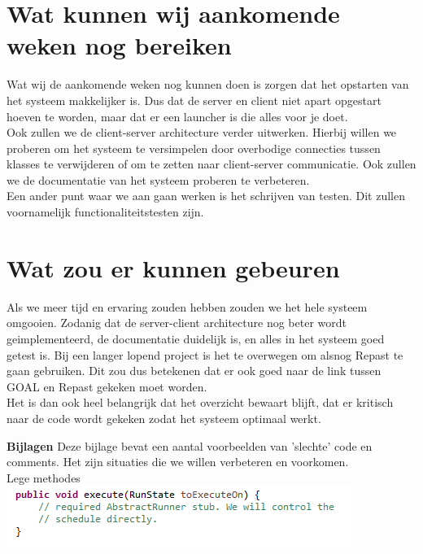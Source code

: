 \documentclass[11pt,a4paper]{article}
\begin{document}
\section{Wat kunnen wij aankomende weken nog bereiken}
Wat wij de aankomende weken nog kunnen doen is zorgen dat het opstarten van het systeem makkelijker is. Dus dat de server en client niet apart opgestart hoeven te worden, maar dat er een launcher is die alles voor je doet. \\
Ook zullen we de client-server architecture verder uitwerken. Hierbij willen we proberen om het systeem te versimpelen door overbodige connecties tussen klasses te verwijderen of om te zetten naar client-server communicatie. Ook zullen we de documentatie van het systeem proberen te verbeteren. \\
Een ander punt waar we aan gaan werken is het schrijven van testen. Dit zullen voornamelijk functionaliteitstesten zijn. 

\section{Wat zou er kunnen gebeuren}
Als we meer tijd en ervaring zouden hebben zouden we het hele systeem omgooien. Zodanig dat de server-client architecture nog beter wordt geimplementeerd, de documentatie duidelijk is, en alles in het systeem goed getest is. Bij een langer lopend project is het te overwegen om alsnog Repast te gaan gebruiken. Dit zou dus betekenen dat er ook goed naar de link tussen GOAL en Repast gekeken moet worden. \\
Het is dan ook heel belangrijk dat het overzicht bewaart blijft, dat er kritisch naar de code wordt gekeken zodat het systeem optimaal werkt.

\newpage
\textbf{Bijlagen} 
Deze bijlage bevat een aantal voorbeelden van 'slechte' code en comments. Het zijn situaties die we willen verbeteren en voorkomen. \\

Lege methodes \\
\includegraphics[width=\linewidth]{emptyMethod.png} \\ 
\end{document}
